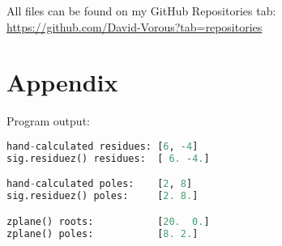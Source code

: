 \documentclass[12pt]{report}
\begin{document}
All files can be found on my GitHub Repositories tab:\\
\url{https://github.com/David-Vorous?tab=repositories}
\pagebreak

\section{Appendix}
Program output:
\begin{lstlisting}[language=Python]
hand-calculated residues: [6, -4] 
sig.residuez() residues:  [ 6. -4.] 

hand-calculated poles:    [2, 8] 
sig.residuez() poles:     [2. 8.] 

zplane() roots:           [20.  0.] 
zplane() poles:           [8. 2.] 
\end{lstlisting}
\end{document}
